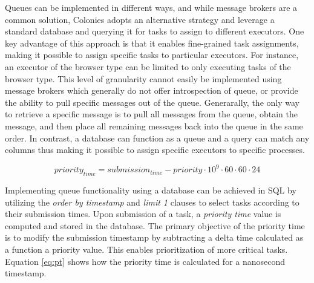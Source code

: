\documentclass{article}
\begin{document}
Queues can be implemented in different ways, and while message brokers are a common solution, Colonies adopts an alternative strategy and leverage a standard database and querying it for tasks to assign to different executors. One key advantage of this approach is that it enables fine-grained task assignments, making it possible to assign specific tasks to particular executors. For instance, an executor of the browser type can be limited to only executing tasks of the browser type. This level of granularity cannot easily be implemented using message brokers which generally do not offer introspection of queue, or provide the ability to pull specific messages out of the queue. Generarally, the only way to retrieve a specific message is to pull all messages from the queue, obtain the message, and then place all remaining messages back into the queue in the same order. In contrast, a database can function as a queue and a query can match any columns thus making it possible to assign specific executors to specific processes.

\begin{equation}
    \label{eq:pt}
    priority_{time}=submission_{time} - priority \cdot 10^9 \cdot 60 \cdot 60 \cdot 24
\end{equation}

Implementing queue functionality using a database can be achieved in SQL by utilizing the \emph{order by timestamp} and \emph{limit 1} clauses to select tasks according to their submission times. Upon submission of a task, a \emph{priority time} value is computed and stored in the database. The primary objective of the priority time is to modify the submission timestamp by subtracting a delta time calculated as a function a priority value. This enables prioritization of more critical tasks. Equation \ref{eq:pt} shows how the priority time is calculated for a nanosecond timestamp. 
\end{document}
